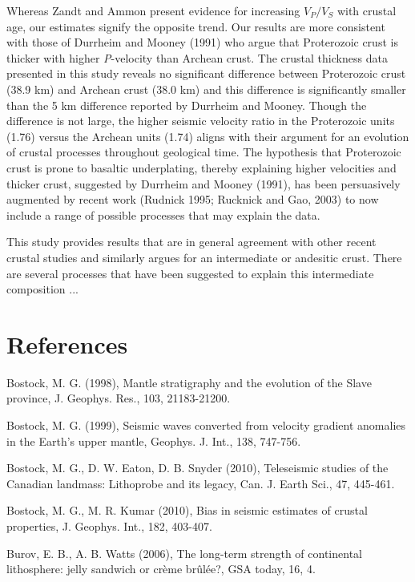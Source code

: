 \documentclass[review]{elsarticle}
\begin{document}
Whereas Zandt and Ammon present evidence for increasing $V_P/V_S$ with crustal age, our estimates signify the opposite trend. Our results are more consistent with those of Durrheim and Mooney (1991) who argue that Proterozoic crust is thicker with higher {\it P}-velocity than Archean crust. The crustal thickness data presented in this study reveals no significant difference between Proterozoic crust (38.9 km) and Archean crust (38.0 km) and this difference is significantly smaller than the 5 km difference reported by Durrheim and Mooney. Though the difference is not large, the higher seismic velocity ratio in the Proterozoic units (1.76) versus the Archean units (1.74) aligns with their argument for an evolution of crustal processes throughout geological time. The hypothesis that Proterozoic crust is prone to basaltic underplating, thereby explaining higher velocities and thicker crust, suggested by Durrheim and Mooney (1991), has been persuasively augmented by recent work (Rudnick 1995; Rucknick and Gao, 2003) to now include a range of possible processes that may explain the data.

This study provides results that are in general agreement with other recent crustal studies and similarly argues for an intermediate or andesitic crust. There are several processes that have been suggested to explain this intermediate composition ...



\section{References}

Bostock, M. G. (1998), Mantle stratigraphy and the evolution of the Slave province, J. Geophys. Res., 103, 21183-21200.

Bostock, M. G. (1999), Seismic waves converted from velocity gradient anomalies in the Earth’s upper mantle, Geophys. J. Int., 138, 747-756.

Bostock, M. G., D. W. Eaton, D. B. Snyder (2010), Teleseismic studies of the Canadian landmass: Lithoprobe and its legacy, Can. J. Earth Sci., 47, 445-461.

Bostock, M. G., M. R. Kumar (2010), Bias in seismic estimates of crustal properties, J. Geophys. Int., 182, 403-407.

Burov, E. B., A. B. Watts (2006), The long-term strength of continental lithosphere: jelly sandwich or crème brûlée?, GSA today, 16, 4.
\end{document}
